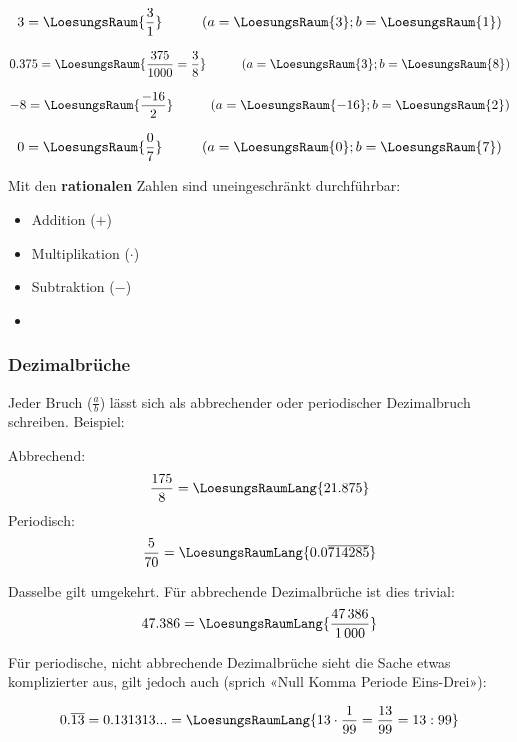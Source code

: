 $$3 = \LoesungsRaum{\frac31} \hspace{1cm} (a=\LoesungsRaum{3}; b=\LoesungsRaum{1})$$

$$0.375 = \LoesungsRaum{\frac{375}{1000}=\frac38} \hspace{1cm} (a=\LoesungsRaum{3}; b=\LoesungsRaum{8})$$

$$-8 = \LoesungsRaum{\frac{-16}{2}} \hspace{1cm} (a=\LoesungsRaum{-16}; b=\LoesungsRaum{2})$$

$$0 = \LoesungsRaum{\frac{0}{7}} \hspace{1cm} (a=\LoesungsRaum{0}; b=\LoesungsRaum{7})$$


Mit den \textbf{rationalen} Zahlen sind uneingeschränkt durchführbar:
\begin{itemize}
\item Addition ($+$)
\item Multiplikation ($\cdot$)
\item Subtraktion ($-$)
\item {}
\end{itemize}

\newpage


\subsubsection{Dezimalbrüche}
Jeder Bruch ($\frac{a}{b}$) lässt sich als
abbrechender oder periodischer Dezimalbruch schreiben. Beispiel:

Abbrechend:
$$\frac{175}{8} = \LoesungsRaumLang{21.875}$$
Periodisch:
$$\frac{5}{70} = \LoesungsRaumLang{0.0\overline{714285}}$$

Dasselbe gilt umgekehrt. Für abbrechende Dezimalbrüche ist dies
trivial:
$$47.386 = \LoesungsRaumLang{\frac{47\,386}{1\,000}}$$

Für periodische, nicht abbrechende
Dezimalbrüche sieht die Sache etwas komplizierter aus,
gilt jedoch auch (sprich «Null Komma Periode Eins-Drei»):

$$0.\overline{13} = 0.131313... = \LoesungsRaumLang{13\cdot{}\frac1{99}=\frac{13}{99} = 13 : 99}$$


